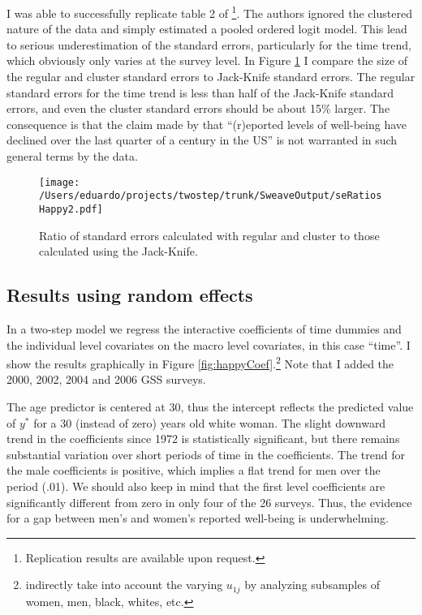 I was able to successfully replicate table 2 of \citet{Blanchflower:2004}\footnote{Replication results are available upon request.}.  The authors  ignored the clustered nature of the data and simply estimated a pooled ordered logit model. This lead to serious underestimation of the standard errors, particularly for the time trend, which obviously only varies at the survey level. In Figure \ref{fig:happySe} I compare the size of the regular and cluster standard errors to Jack-Knife standard errors. The regular standard errors for the time trend is less than half of the Jack-Knife standard errors, and even the cluster standard errors should be about 15\% larger. The consequence is that the claim made by  \citeauthor{Blanchflower:2004} that ``(r)eported levels of well-being have declined over the last quarter of a century in the US'' is not warranted in such general terms by the data.

\begin{figure}
  \centering
  \texttt{[image: /Users/eduardo/projects/twostep/trunk/SweaveOutput/seRatiosHappy2.pdf]}
  \caption{Ratio of standard errors calculated with regular and cluster to those calculated using the Jack-Knife. }
  \label{fig:happySe}
\end{figure}


%   

\subsection{Results using random effects}

In a two-step model we regress the interactive coefficients of time dummies and the individual level covariates on the macro level covariates, in this case ``time''. I show the results graphically in Figure \ref{fig:happyCoef}.\footnote{\citeauthor{Blanchflower:2004} indirectly take into account the varying $u_{1j}$ by analyzing subsamples of women, men, black, whites, etc.} Note that I added the 2000, 2002, 2004 and 2006 GSS surveys.

The age predictor is centered at 30, thus the intercept reflects the predicted value of $y^*$ for a 30 (instead of zero) years old white woman. The slight downward trend in the coefficients since 1972 is statistically significant, but there remains substantial variation over short periods of time in the coefficients. The trend for the male coefficients is positive, which implies a flat trend for men over the period (.01). We should also keep in mind that the first level coefficients are significantly different from zero in only four of the 26 surveys. Thus, the evidence for a gap between men's and women's reported well-being is underwhelming.


